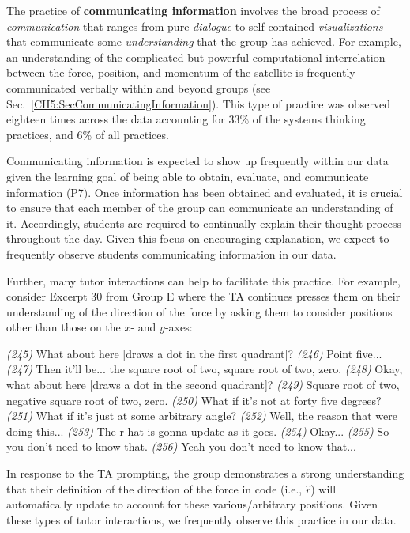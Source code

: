 \documentclass{msuphddissertation}
\begin{document}
\begin{doublespace}
The practice of \textbf{communicating information} involves the broad process of \textit{communication} that ranges from pure \textit{dialogue} to self-contained \textit{visualizations} that communicate some \textit{understanding} that the group has achieved.  For example, an understanding of the complicated but powerful computational interrelation between the force, position, and momentum of the satellite is frequently communicated verbally within and beyond groups (see Sec.~\ref{CH5:SecCommunicatingInformation}).  This type of practice was observed eighteen times across the data  accounting for $33\%$ of the systems thinking practices, and $6\%$ of all practices.

Communicating information is expected to show up frequently within our data given the learning goal of being able to obtain, evaluate, and communicate information (P7).  Once information has been obtained and evaluated, it is crucial to ensure that each member of the group can communicate an understanding of it.  Accordingly, students are required to continually explain their thought process throughout the day.  Given this focus on encouraging explanation, we expect to frequently observe students communicating information in our data.

Further, many tutor interactions can help to facilitate this practice.  For example, consider Excerpt 30 from Group E where the TA continues presses them on their understanding of the direction of the force by asking them to consider positions other than those on the $x$- and $y$-axes: \begin{description}
\TA \textit{(245)} What about here [draws a dot in the first quadrant]?
\SD \textit{(246)} Point five...
\SB \textit{(247)} Then it'll be... the square root of two, square root of two, zero.
\TA \textit{(248)} Okay, what about here [draws a dot in the second quadrant]?
\SB \textit{(249)} Square root of two, negative square root of two, zero.
\TA \textit{(250)} What if it's not at forty five degrees?
\TA \textit{(251)} What if it's just at some arbitrary angle?
\SB \textit{(252)} Well, the reason that were doing this...			
\SD \textit{(253)} The r hat is gonna update as it goes.
\TA \textit{(254)} Okay...
\SD \textit{(255)} So you don’t need to know that.
\SB \textit{(256)} Yeah you don’t need {to know that}...		
\end{description}  In response to the TA prompting, the group demonstrates a strong understanding that their definition of the direction of the force in code (i.e., $\hat{r}$) will automatically update to account for these various/arbitrary positions.  Given these types of tutor interactions, we frequently observe this practice in our data.


\end{doublespace}
\end{document}
